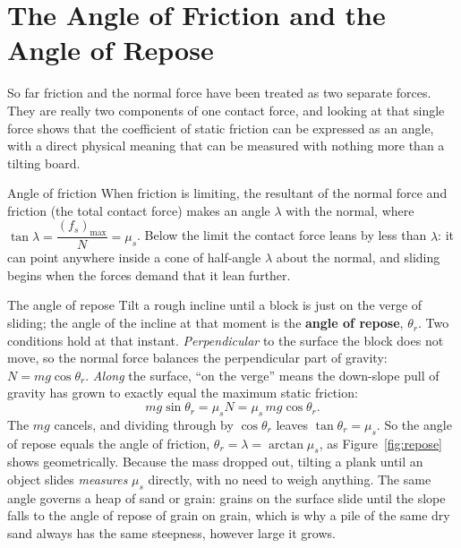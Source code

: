 \section{The Angle of Friction and the Angle of Repose}

So far friction and the normal force have been treated as two separate forces. They are really two
components of one contact force, and looking at that single force shows that the coefficient of static
friction can be expressed as an angle, with a direct physical meaning that can be measured with nothing
more than a tilting board.

\begin{defbox}{Angle of friction}
When friction is limiting, the resultant of the normal force and friction (the total contact force)
makes an angle $\lambda$ with the normal, where $\tan\lambda=\dfrac{(f_s)_{\max}}{N}=\mu_s$. Below the
limit the contact force leans by less than $\lambda$: it can point anywhere inside a cone of half-angle
$\lambda$ about the normal, and sliding begins when the forces demand that it lean further.
\end{defbox}

\begin{derivbox}{The angle of repose}
Tilt a rough incline until a block is just on the verge of sliding; the angle of the incline at that
moment is the \textbf{angle of repose}, $\theta_r$. Two conditions hold at that instant.
\emph{Perpendicular} to the surface the block does not move, so the normal force balances the
perpendicular part of gravity: $N=mg\cos\theta_r$. \emph{Along} the surface, ``on the verge'' means the
down-slope pull of gravity has grown to exactly equal the maximum static friction:
\[
mg\sin\theta_r=\mu_s N=\mu_s\,mg\cos\theta_r.
\]
The $mg$ cancels, and dividing through by $\cos\theta_r$ leaves $\boxed{\tan\theta_r=\mu_s}$. So the
angle of repose equals the angle of friction, $\theta_r=\lambda=\arctan\mu_s$, as Figure~\ref{fig:repose} shows geometrically. Because the mass dropped
out, tilting a plank until an object slides \emph{measures} $\mu_s$ directly, with no need to weigh
anything. The same angle governs a heap of sand or grain: grains on the surface slide until the slope
falls to the angle of repose of grain on grain, which is why a pile of the same dry sand always has the same steepness, however large it grows.
\end{derivbox}

\begin{figure}[htbp]
\centering
{}
\end{figure}

